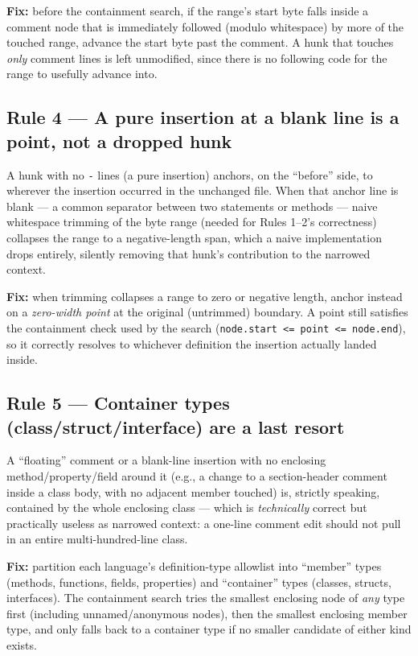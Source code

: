 \documentclass[11pt]{article}
\newcommand{\code}[1]{\texttt{#1}}
\begin{document}
\textbf{Fix:} before the containment search, if the range's start byte falls
inside a comment node that is immediately followed (modulo whitespace) by more of
the touched range, advance the start byte past the comment. A hunk that touches
\emph{only} comment lines is left unmodified, since there is no following code for
the range to usefully advance into.

\subsection{Rule 4 --- A pure insertion at a blank line is a point, not a dropped hunk}

A hunk with no \code{-} lines (a pure insertion) anchors, on the ``before'' side,
to wherever the insertion occurred in the unchanged file. When that anchor line is
blank --- a common separator between two statements or methods --- naive
whitespace trimming of the byte range (needed for Rules 1--2's correctness)
collapses the range to a negative-length span, which a naive implementation drops
entirely, silently removing that hunk's contribution to the narrowed context.

\textbf{Fix:} when trimming collapses a range to zero or negative length, anchor
instead on a \emph{zero-width point} at the original (untrimmed) boundary. A point
still satisfies the containment check used by the search
(\code{node.start <= point <= node.end}), so it correctly resolves to whichever
definition the insertion actually landed inside.

\subsection{Rule 5 --- Container types (class/struct/interface) are a last resort}

A ``floating'' comment or a blank-line insertion with no enclosing
method/property/field around it (e.g., a change to a section-header comment inside
a class body, with no adjacent member touched) is, strictly speaking, contained by
the whole enclosing class --- which is \emph{technically} correct but practically
useless as narrowed context: a one-line comment edit should not pull in an entire
multi-hundred-line class.

\textbf{Fix:} partition each language's definition-type allowlist into ``member''
types (methods, functions, fields, properties) and ``container'' types (classes,
structs, interfaces). The containment search tries the smallest enclosing node of
\emph{any} type first (including unnamed/anonymous nodes), then the smallest
enclosing member type, and only falls back to a container type if no smaller
candidate of either kind exists.
\end{document}
